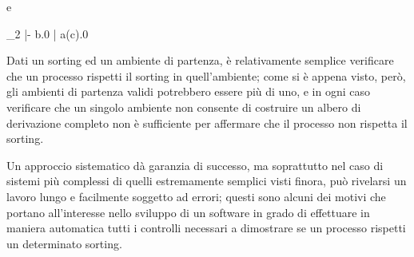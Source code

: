 e

\begin{pilisting}
  {\Psi_2 |- \langle b\rangle.0 \; | \; a(c).0}
\end{pilisting}

Dati un sorting ed un ambiente di partenza, \`e relativamente semplice
verificare che un processo rispetti il sorting in quell'ambiente; come
si \`e appena visto, per\`o, gli ambienti di partenza validi potrebbero
essere pi\`u di uno, e in ogni caso verificare che un singolo ambiente
non consente di costruire un albero di derivazione completo non \`e
sufficiente per affermare che il processo non rispetta il sorting.

Un approccio sistematico d\`a garanzia di successo, ma soprattutto nel
caso di sistemi pi\`u complessi di quelli estremamente semplici visti
finora, pu\`o rivelarsi un lavoro lungo e facilmente soggetto ad
errori; questi sono alcuni dei motivi che portano all'interesse nello
sviluppo di un software in grado di effettuare in maniera automatica
tutti i controlli necessari a dimostrare se un processo rispetti un
determinato sorting.
